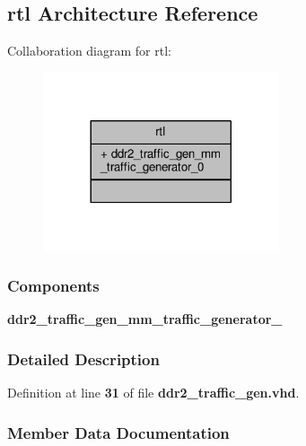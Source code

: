 \subsection{rtl Architecture Reference}
\label{classddr2__traffic__gen_1_1rtl}


Collaboration diagram for rtl\+:\nopagebreak
\begin{figure}[H]
\begin{center}
\leavevmode
\includegraphics[width=197pt]{d5/d92/classddr2__traffic__gen_1_1rtl__coll__graph}
\end{center}
\end{figure}
\subsubsection*{Components}
 \begin{DoxyCompactItemize}
\item 
{\bf ddr2\+\_\+traffic\+\_\+gen\+\_\+mm\+\_\+traffic\+\_\+generator\+\_}  {\bfseries }  
\end{DoxyCompactItemize}


\subsubsection{Detailed Description}


Definition at line {\bf 31} of file {\bf ddr2\+\_\+traffic\+\_\+gen.\+vhd}.



\subsubsection{Member Data Documentation}
